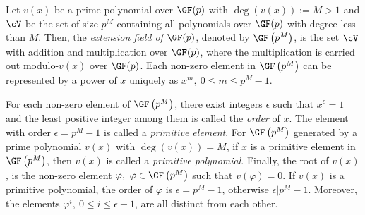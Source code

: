 Let $v(x)$ be a prime polynomial over $\GF(p)$ with $\deg(v(x)):=M>1$ and $\cV$ be the set of size $p^M$ containing all polynomials over $\GF(p)$ with degree less than $M$. Then, the \textit{extension field of $\GF(p)$}, denoted by $\GF\left(p^M\right)$, is the set $\cV$ with addition and multiplication over $\GF(p)$, where the multiplication is carried out modulo-$v(x)$ over $\GF(p)$.
Each non-zero element in $\GF \left(p^M\right)$ can be represented by a power of $x$ uniquely as $x^m,~0 \leq m \leq p^M-1$. %

For each non-zero element of $\GF \left(p^M\right)$, there exist integers $\epsilon$ such that $x^{\epsilon}=1$ and the least positive integer among them is called the \textit{order} of $x$. The element with order $\epsilon=p^M-1$ is called a \textit{primitive element}. For $\GF \left(p^M\right)$ generated by a prime polynomial $v(x)$ with $\deg(v(x))=M$, if $x$ is a primitive element in $\GF \left(p^M\right)$, then  $v(x)$ is called a \textit{primitive polynomial}. 
%
Finally, the root of $v(x)$, is the non-zero element $\varphi,~\varphi \in \GF \left(p^M\right)$ such that $v(\varphi)=0$. If $v(x)$ is a primitive polynomial, the order of $\varphi$ is $\epsilon=p^M-1$, otherwise $\epsilon | p^M-1$. 
Moreover, the elements $\varphi^i,~0 \leq i \leq \epsilon -1$, are all distinct from each other.
 

